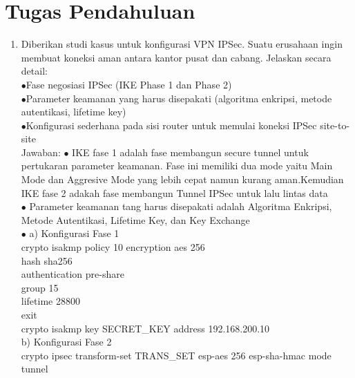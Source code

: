 \section{Tugas Pendahuluan}
\begin{enumerate}
	\item Diberikan studi kasus untuk konfigurasi VPN IPSec. Suatu erusahaan ingin membuat koneksi aman antara kantor pusat dan cabang. Jelaskan secara detail:\\
	$\bullet$Fase negosiasi IPSec (IKE Phase 1 dan Phase 2)\\
	$\bullet$Parameter keamanan yang harus disepakati (algoritma enkripsi, metode autentikasi, lifetime key)\\
	$\bullet$Konfigurasi sederhana pada sisi router untuk memulai koneksi IPSec site-to-site\\
	Jawaban: $\bullet$ IKE fase 1 adalah fase membangun secure tunnel untuk pertukaran parameter keamanan. Fase ini memiliki dua mode yaitu Main Mode dan Aggresive Mode yang lebih cepat namun kurang aman.Kemudian IKE fase 2 adakah fase membangun Tunnel IPSec untuk lalu lintas data\\
	$\bullet$ Parameter keamanan tang harus disepakati adalah Algoritma Enkripsi, Metode Autentikasi, Lifetime Key, dan Key Exchange\\
	$\bullet$ a) Konfigurasi Fase 1\\
	crypto isakmp policy 10
	encryption aes 256\\
	hash sha256\\
	authentication pre-share\\
	group 15\\
	lifetime 28800\\
	exit\\
	
	crypto isakmp key SECRET\_KEY address 192.168.200.10\\
	b) Konfigurasi Fase 2\\
	crypto ipsec transform-set TRANS\_SET esp-aes 256 esp-sha-hmac
	mode tunnel\\
	

\end{enumerate}
